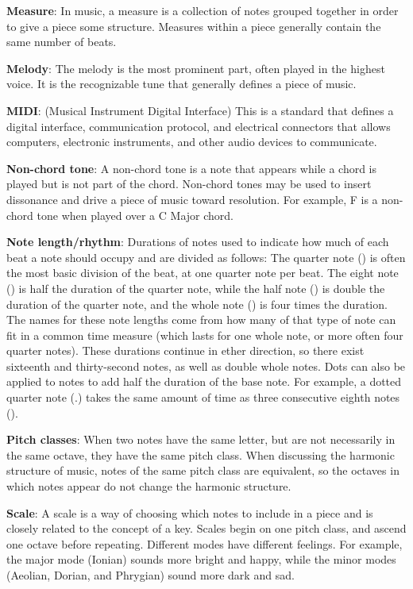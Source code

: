 \textbf{Measure}: In music, a measure is a collection of notes grouped together in order to give a piece some structure.
Measures within a piece generally contain the same number of beats.

\textbf{Melody}: The melody is the most prominent part, often played in the highest voice.
It is the recognizable tune that generally defines a piece of music.

\textbf{MIDI}: (Musical Instrument Digital Interface) This is a standard that defines a digital interface, communication protocol, and electrical connectors that allows computers, electronic instruments, and other audio devices to communicate.

\textbf{Non-chord tone}: A non-chord tone is a note that appears while a chord is played but is not part of the chord.
Non-chord tones may be used to insert dissonance and drive a piece of music toward resolution.
For example, F is a non-chord tone when played over a C Major chord.

\textbf{Note length/rhythm}: Durations of notes used to indicate how much of each beat a note should occupy and are divided as follows:
The quarter note (\quarternote) is often the most basic division of the beat, at one quarter note per beat.
The eight note (\eighthnote) is half the duration of the quarter note, while the half note (\halfnote) is double the duration of the quarter note, and the whole note (\fullnote) is four times the duration.
The names for these note lengths come from how many of that type of note can fit in a common time measure (which lasts for one whole note, or more often four quarter notes).
These durations continue in ether direction, so there exist sixteenth and thirty-second notes, as well as double whole notes.
Dots can also be applied to notes to add half the duration of the base note.
For example, a dotted quarter note (\quarternote.) takes the same amount of time as three consecutive eighth notes (\eighthnote \eighthnote \eighthnote).

\textbf{Pitch classes}: When two notes have the same letter, but are not necessarily in the same octave, they have the same pitch class.
When discussing the harmonic structure of music, notes of the same pitch class are equivalent, so the octaves in which notes appear do not change the harmonic structure.

\textbf{Scale}: A scale is a way of choosing which notes to include in a piece and is closely related to the concept of a key.
Scales begin on one pitch class, and ascend one octave before repeating.
Different modes have different feelings.
For example, the major mode (Ionian) sounds more bright and happy, while the minor modes (Aeolian, Dorian, and Phrygian) sound more dark and sad.

